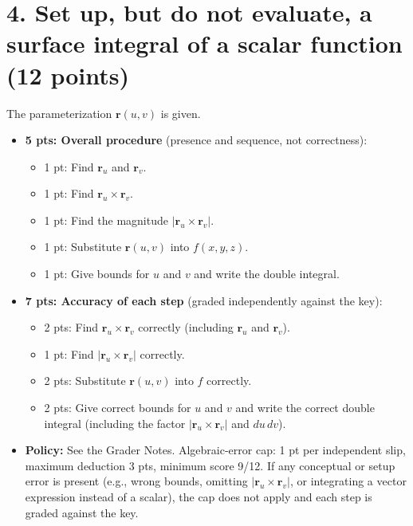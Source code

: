 \documentclass[11pt,letterpaper]{article}
\renewcommand{\vec}[1]{\mathbf{#1}}
\begin{document}
\section*{4. Set up, but do not evaluate, a surface integral of a scalar function (12 points)}
The parameterization $\vec r(u,v)$ is given.
\begin{itemize}
  \item \textbf{5 pts: Overall procedure} (presence and sequence, not correctness):
  \begin{itemize}
    \item 1 pt: Find $\vec r_u$ and $\vec r_v$.
    \item 1 pt: Find $\vec r_u\times\vec r_v$.
    \item 1 pt: Find the magnitude $|\vec r_u\times\vec r_v|$.
    \item 1 pt: Substitute $\vec r(u,v)$ into $f(x,y,z)$.
    \item 1 pt: Give bounds for $u$ and $v$ and write the double integral.
  \end{itemize}
  \item \textbf{7 pts: Accuracy of each step} (graded independently against the key):
  \begin{itemize}
    \item 2 pts: Find $\vec r_u\times\vec r_v$ correctly (including $\vec r_u$ and $\vec r_v$).
    \item 1 pt: Find $|\vec r_u\times\vec r_v|$ correctly.
    \item 2 pts: Substitute $\vec r(u,v)$ into $f$ correctly.
    \item 2 pts: Give correct bounds for $u$ and $v$ and write the correct double integral (including the factor $|\vec r_u\times\vec r_v|$ and $du\,dv$).
  \end{itemize}
  \item \textbf{Policy:} See the Grader Notes. Algebraic-error cap: 1 pt per independent slip, maximum deduction 3 pts, minimum score 9/12. If any conceptual or setup error is present (e.g., wrong bounds, omitting $|\vec r_u\times\vec r_v|$, or integrating a vector expression instead of a scalar), the cap does not apply and each step is graded against the key.
\end{itemize}
 
\end{document}
